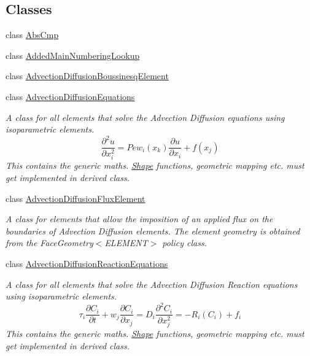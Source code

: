 \subsection*{Classes}
\begin{DoxyCompactItemize}
\item 
class \hyperlink{classoomph_1_1AbsCmp}{Abs\+Cmp}
\item 
class \hyperlink{classoomph_1_1AddedMainNumberingLookup}{Added\+Main\+Numbering\+Lookup}
\item 
class \hyperlink{classoomph_1_1AdvectionDiffusionBoussinesqElement}{Advection\+Diffusion\+Boussinesq\+Element}
\item 
class \hyperlink{classoomph_1_1AdvectionDiffusionEquations}{Advection\+Diffusion\+Equations}
\begin{DoxyCompactList}\small\item\em A class for all elements that solve the Advection Diffusion equations using isoparametric elements. \[ \frac{\partial^2 u}{\partial x_i^2} = Pe w_i(x_k) \frac{\partial u}{\partial x_i} + f(x_j) \] This contains the generic maths. \hyperlink{classoomph_1_1Shape}{Shape} functions, geometric mapping etc. must get implemented in derived class. \end{DoxyCompactList}\item 
class \hyperlink{classoomph_1_1AdvectionDiffusionFluxElement}{Advection\+Diffusion\+Flux\+Element}
\begin{DoxyCompactList}\small\item\em A class for elements that allow the imposition of an applied flux on the boundaries of Advection Diffusion elements. The element geometry is obtained from the Face\+Geometry$<$\+E\+L\+E\+M\+E\+N\+T$>$ policy class. \end{DoxyCompactList}\item 
class \hyperlink{classoomph_1_1AdvectionDiffusionReactionEquations}{Advection\+Diffusion\+Reaction\+Equations}
\begin{DoxyCompactList}\small\item\em A class for all elements that solve the Advection Diffusion Reaction equations using isoparametric elements. \[ \tau_{i} \frac{\partial C_{i}}{\partial t} + w_{j} \frac{\partial C_{i}}{\partial x_{j}} = D_{i}\frac{\partial^2 C_{i}}{\partial x_j^2} = - R_{i}(C_{i}) + f_{i} \] This contains the generic maths. \hyperlink{classoomph_1_1Shape}{Shape} functions, geometric mapping etc. must get implemented in derived class. \end{DoxyCompactList}\item 

\end{DoxyCompactItemize}
